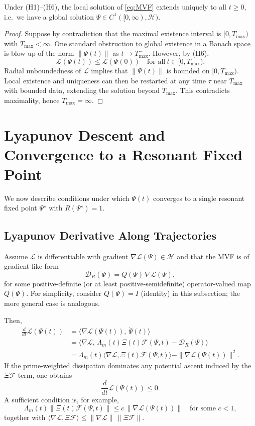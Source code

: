 \documentclass[11pt]{article}
\begin{document}
\begin{proposition}
Under (H1)--(H6), the local solution of \eqref{eq:MVF} extends uniquely to all $t\ge 0$, i.e.\ we have a global solution $\Psi\in C^1([0,\infty),\mathcal{H})$.
\end{proposition}

\begin{proof}
Suppose by contradiction that the maximal existence interval is $[0,T_{\max})$ with $T_{\max}<\infty$. One standard obstruction to global existence in a Banach space is blow-up of the norm $\|\Psi(t)\|$ as $t\to T_{\max}^-$. However, by (H6),
\[
  \mathcal{L}(\Psi(t))\le \mathcal{L}(\Psi(0))
  \quad\text{for all}\ t\in[0,T_{\max}).
\]
Radial unboundedness of $\mathcal{L}$ implies that $\|\Psi(t)\|$ is bounded on $[0,T_{\max})$. Local existence and uniqueness can then be restarted at any time $\tau$ near $T_{\max}$ with bounded data, extending the solution beyond $T_{\max}$. This contradicts maximality, hence $T_{\max}=\infty$.
\end{proof}

\section{Lyapunov Descent and Convergence to a Resonant Fixed Point}

We now describe conditions under which $\Psi(t)$ converges to a single resonant fixed point $\Psi^\star$ with $R(\Psi^\star)=1$.

\subsection{Lyapunov Derivative Along Trajectories}

Assume $\mathcal{L}$ is differentiable with gradient $\nabla\mathcal{L}(\Psi)\in\mathcal{H}$ and that the MVF is of gradient-like form
\[
  \mathcal{D}_R(\Psi) = Q(\Psi)\,\nabla\mathcal{L}(\Psi),
\]
for some positive-definite (or at least positive-semidefinite) operator-valued map $Q(\Psi)$. For simplicity, consider $Q(\Psi)=I$ (identity) in this subsection; the more general case is analogous.

Then,
\[
  \begin{aligned}
  \frac{d}{dt}\mathcal{L}(\Psi(t))
  &= \bigl\langle \nabla\mathcal{L}(\Psi(t)),\,\dot{\Psi}(t)\bigr\rangle \\
  &= \bigl\langle \nabla\mathcal{L},\,\Lambda_m(t)\Xi(t)\mathcal{F}(\Psi,t) - \mathcal{D}_R(\Psi)\bigr\rangle \\
  &= \Lambda_m(t)\bigl\langle \nabla\mathcal{L},\Xi(t)\mathcal{F}(\Psi,t)\bigr\rangle
     - \|\nabla\mathcal{L}(\Psi(t))\|^2.
  \end{aligned}
\]
If the prime-weighted dissipation dominates any potential ascent induced by the $\Xi\mathcal{F}$ term, one obtains
\[
  \frac{d}{dt}\mathcal{L}(\Psi(t)) \le 0.
\]
A sufficient condition is, for example,
\[
  \Lambda_m(t)\bigl\|\Xi(t)\mathcal{F}(\Psi,t)\bigr\|
  \le
  c\,\|\nabla\mathcal{L}(\Psi(t))\|
  \quad \text{for some } c < 1,
\]
together with $\langle \nabla\mathcal{L},\Xi\mathcal{F}\rangle\le \|\nabla\mathcal{L}\|\,\|\Xi\mathcal{F}\|$.
\end{document}
